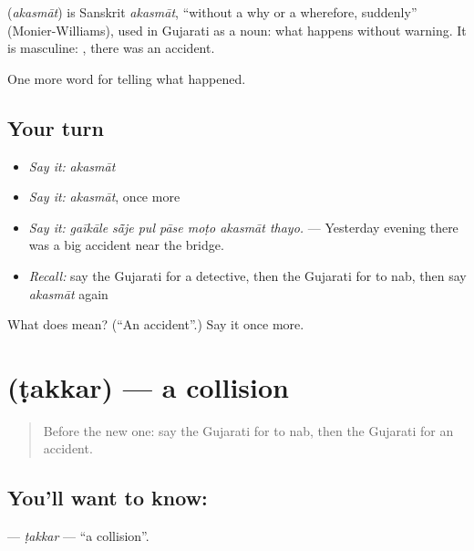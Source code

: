 \begin{cousinweb}
\textbf{} (\emph{akasmāt}) is Sanskrit \emph{akasmāt}, \textquotedblleft{}without a why or a wherefore, suddenly\textquotedblright{} (Monier-Williams), used in Gujarati as a noun: what happens without warning. It is masculine: \textbf{ }, there was an accident.
\end{cousinweb}

\begin{grammarlens}[title={What you've built}]
One more word for telling what happened.
\end{grammarlens}

\subsection*{Your turn}
\begin{itemize}
\raggedright
  \item \emph{Say it:} \emph{akasmāt}
  \item \emph{Say it:} \emph{akasmāt}, once more
  \item \emph{Say it:} \emph{gaīkāle sā̃je pul pāse moṭo akasmāt thayo.} — Yesterday evening there was a big accident near the bridge.
  \item \emph{Recall:} say the Gujarati for a detective, then the Gujarati for to nab, then say \emph{akasmāt} again
\end{itemize}

\begin{tcolorbox}[breakable,colback=teal!4,colframe=teal!35!black,title={Before you move on}]
What does  mean? (\textquotedblleft{}An accident\textquotedblright{}.) Say it once more.
\end{tcolorbox}
\section[\texorpdfstring{\gu{ટક્કર} (ṭakkar)}{ટક્કર (ṭakkar)}]{ (ṭakkar) — a collision}

\label{lesson:GU-C293-takkar}



\begin{quote}
Before the new one: say the Gujarati for to nab, then the Gujarati for an accident.
\end{quote}

\subsection*{You'll want to know: }
\textbf{} — \emph{ṭakkar} — \textquotedblleft{}a collision\textquotedblright{}.

